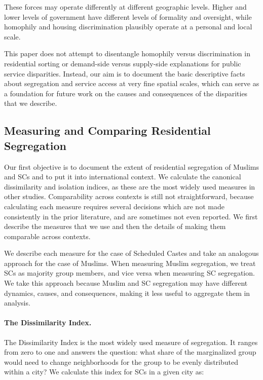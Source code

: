 \documentclass[12pt]{article}
\begin{document}
These forces may operate differently at different geographic levels. Higher and lower levels of government have different levels of formality and oversight, while homophily and housing discrimination plausibly operate at a personal and local scale.

This paper does not attempt to disentangle homophily versus discrimination in residential sorting or demand-side versus supply-side explanations for public service disparities. Instead, our aim is to document the basic descriptive facts about segregation and service access at very fine spatial scales, which can serve as a foundation for future work on the causes and consequences of the disparities that we describe.

\subsection{Measuring and Comparing Residential Segregation}

Our first objective is to document the extent of residential segregation of Muslims and SCs and to put it into international context. We calculate the canonical dissimilarity and isolation indices, as these are the most widely used measures in other studies. Comparability across contexts is still not straightforward, because calculating each measure requires several decisions which are not made consistently in the prior literature, and are sometimes not even reported. We first describe the measures that we use and then the details of making them comparable across contexts.

We describe each measure for the case of Scheduled Castes and take an analogous approach for the case of Muslims. When measuring Muslim segregation, we treat SCs as majority group members, and vice versa when measuring SC segregation. We take this approach because Muslim and SC segregation may have different dynamics, causes, and consequences, making it less useful to aggregate them in analysis.

\paragraph{The Dissimilarity Index.} The Dissimilarity Index \citep{duncan1955} is the most widely used measure of segregation. It ranges from zero to one and answers the question: what share of the marginalized group would need to change neighborhoods for the group to be evenly distributed within a city? We calculate this index for SCs in a given city as:
\end{document}
